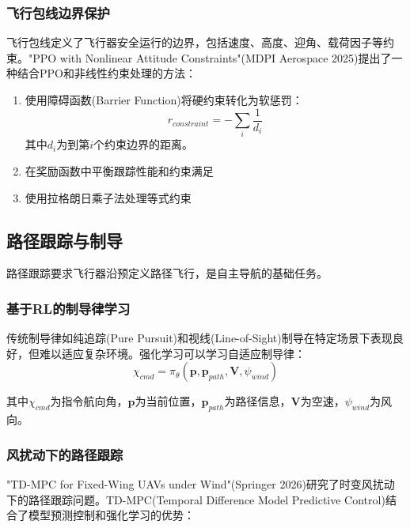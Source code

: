 \documentclass[12pt,a4paper]{ctexart}
\begin{document}
\subsubsection{飞行包线边界保护}

飞行包线定义了飞行器安全运行的边界，包括速度、高度、迎角、载荷因子等约束。"PPO with Nonlinear Attitude Constraints"(MDPI Aerospace 2025)提出了一种结合PPO和非线性约束处理的方法：

\begin{enumerate}
    \item 使用障碍函数(Barrier Function)将硬约束转化为软惩罚：
    \begin{equation}
        r_{constraint} = -\sum_i \frac{1}{d_i}
    \end{equation}
    其中$d_i$为到第$i$个约束边界的距离。
    
    \item 在奖励函数中平衡跟踪性能和约束满足
    
    \item 使用拉格朗日乘子法处理等式约束
\end{enumerate}

\subsection{路径跟踪与制导}

路径跟踪要求飞行器沿预定义路径飞行，是自主导航的基础任务。

\subsubsection{基于RL的制导律学习}

传统制导律如纯追踪(Pure Pursuit)和视线(Line-of-Sight)制导在特定场景下表现良好，但难以适应复杂环境。强化学习可以学习自适应制导律：
\begin{equation}
    \chi_{cmd} = \pi_\theta(\mathbf{p}, \mathbf{p}_{path}, \mathbf{V}, \psi_{wind})
\end{equation}

其中$\chi_{cmd}$为指令航向角，$\mathbf{p}$为当前位置，$\mathbf{p}_{path}$为路径信息，$\mathbf{V}$为空速，$\psi_{wind}$为风向。

\subsubsection{风扰动下的路径跟踪}

"TD-MPC for Fixed-Wing UAVs under Wind"(Springer 2026)研究了时变风扰动下的路径跟踪问题。TD-MPC(Temporal Difference Model Predictive Control)结合了模型预测控制和强化学习的优势：
\end{document}
